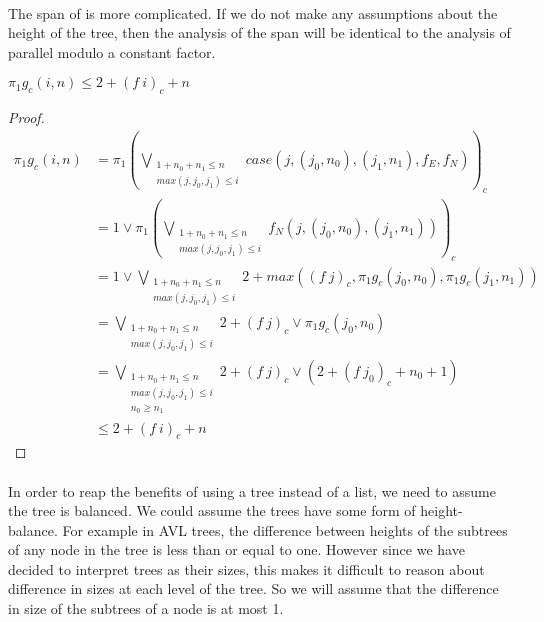 \paragraph{}
The span of  is more complicated. If we do not make any assumptions
about the height of the tree, then the analysis of the span will be identical
to the analysis of parallel  modulo a constant factor.
%
\begin{lemma}
	$\pi_1 g_c(i,n) \leq 2 + (f\ i)_c + n$
\end{lemma}
%
\begin{proof}
\begin{align*}
    \pi_1 g_c(i,n) &= \pi_1 (\bigvee\limits_{\substack{1 + n_0 + n_1 \leq n \\ max(j,j_0,j_1) \leq i}} case(j,(j_0,n_0),(j_1,n_1), f_E, f_N))_c \\
                  &= 1 \vee \pi_1 (\bigvee\limits_{\substack{1 + n_0 + n_1 \leq n \\ max(j,j_0,j_1) \leq i}} f_N(j,(j_0,n_0),(j_1,n_1)))_c \\
                  &= 1 \vee \bigvee\limits_{\substack{1 + n_0 + n_1 \leq n \\ max(j,j_0,j_1) \leq i}} 2 + max((f\ j)_c,\pi_1 g_c(j_0,n_0),\pi_1 g_c(j_1,n_1)) \\
                  &= \bigvee\limits_{\substack{1 + n_0 + n_1 \leq n \\ max(j,j_0,j_1) \leq i}} 2 + (f\ j)_c \vee \pi_1 g_c(j_0,n_0) \\
                  &= \bigvee\limits_{\substack{1 + n_0 + n_1 \leq n \\ max(j,j_0,j_1) \leq i \\ n_0 \geq n_1}} 2 + (f\ j)_c \vee (2 + (f\ j_0)_c + n_0 + 1)\\
                  &\leq 2 + (f\ i)_c + n
\end{align*}
\end{proof}
%

\paragraph{}
In order to reap the benefits of using a tree instead of a list, we need to
assume the tree is balanced. We could assume the trees have some form of
height-balance. For example in AVL trees, the difference between heights of the
subtrees of any node in the tree is less than or equal to one. However since we
have decided to interpret trees as their sizes, this makes it difficult to
reason about difference in sizes at each level of the tree. So we will assume
that the difference in size of the subtrees of a node is at most 1.

